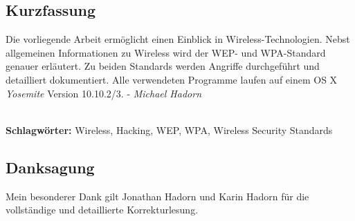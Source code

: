 
\subsection*{Kurzfassung}
Die vorliegende Arbeit ermöglicht einen Einblick in Wireless-Technologien.
Nebst allgemeinen Informationen zu Wireless wird der WEP- und WPA-Standard genauer erläutert.
Zu beiden Standards werden Angriffe durchgeführt und detailliert dokumentiert.
Alle verwendeten Programme laufen auf einem OS X \textit{Yosemite} Version 10.10.2/3.
 - \textit{Michael Hadorn}


%
\mbox{}\\[0.5\baselineskip]\noindent
\textbf{Schlagwörter:} 
Wireless, Hacking, WEP, WPA, Wireless Security Standards

\vfill
\subsection*{Danksagung}
Mein besonderer Dank gilt Jonathan Hadorn und Karin Hadorn für die vollständige und detaillierte Korrekturlesung.
